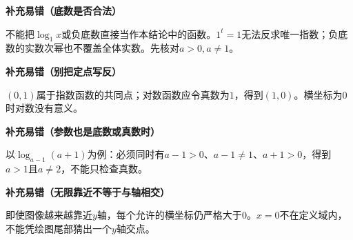 \clearpage
\begin{trapbox}
\textbf{\textcolor{CTrap}{补充易错（底数是否合法）}}

不能把$\log_1x$或负底数直接当作本结论中的函数。$1^t=1$无法反求唯一指数；负底数的实数次幂也不覆盖全体实数。先核对$a>0,a\ne1$。

\end{trapbox}
\clearpage
\begin{trapbox}
\textbf{\textcolor{CTrap}{补充易错（别把定点写反）}}

$(0,1)$属于指数函数的共同点；对数函数应令真数为$1$，得到$(1,0)$。横坐标为$0$时对数没有意义。

\end{trapbox}
\clearpage
\begin{trapbox}
\textbf{\textcolor{CTrap}{补充易错（参数也是底数或真数时）}}

以$\log_{a-1}(a+1)$为例：必须同时有$a-1>0$、$a-1\ne1$、$a+1>0$，得到$a>1$且$a\ne2$，不能只检查真数。

\end{trapbox}
\clearpage
\begin{trapbox}
\textbf{\textcolor{CTrap}{补充易错（无限靠近不等于与轴相交）}}

即使图像越来越靠近$y$轴，每个允许的横坐标仍严格大于$0$。$x=0$不在定义域内，不能凭绘图尾部猜出一个$y$轴交点。
\end{trapbox}
